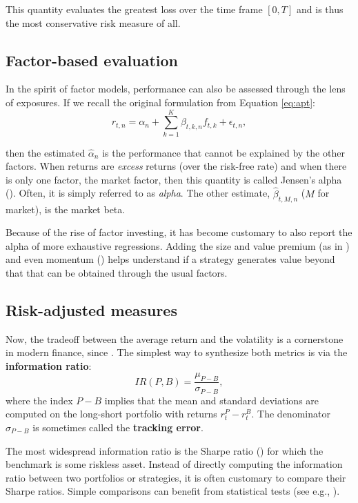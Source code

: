 \documentclass[]{krantz}
\theoremstyle{definition}
\theoremstyle{definition}
\theoremstyle{definition}
\theoremstyle{remark}
\begin{document}
This quantity evaluates the greatest loss over the time frame \([0,T]\)
and is thus the most conservative risk measure of all.

\hypertarget{factor-based-evaluation}{%
\subsection{Factor-based evaluation}\label{factor-based-evaluation}}

In the spirit of factor models, performance can also be assessed through
the lens of exposures. If we recall the original formulation from
Equation \eqref{eq:apt}:
\[r_{t,n}= \alpha_n+\sum_{k=1}^K\beta_{t,k,n}f_{t,k}+\epsilon_{t,n}, \]

then the estimated \(\hat{\alpha}_n\) is the performance that cannot be
explained by the other factors. When returns are \emph{excess} returns
(over the risk-free rate) and when there is only one factor, the market
factor, then this quantity is called Jensen's alpha
(\citet{jensen1968performance}). Often, it is simply referred to as
\emph{alpha}. The other estimate, \(\hat{\beta}_{t,M,n}\) (\(M\) for
market), is the market beta.

Because of the rise of factor investing, it has become customary to also
report the alpha of more exhaustive regressions. Adding the size and
value premium (as in \citet{fama1993common}) and even momentum
(\citet{carhart1997persistence}) helps understand if a strategy
generates value beyond that that can be obtained through the usual
factors.

\hypertarget{risk-adjusted-measures}{%
\subsection{Risk-adjusted measures}\label{risk-adjusted-measures}}

Now, the tradeoff between the average return and the volatility is a
cornerstone in modern finance, since \citet{markowitz1952portfolio}. The
simplest way to synthesize both metrics is via the \textbf{information
ratio}: \[IR(P,B)=\frac{\mu_{P-B}}{\sigma_{P-B}},\] where the index
\(P-B\) implies that the mean and standard deviations are computed on
the long-short portfolio with returns \(r_t^P-r_t^B\). The denominator
\(\sigma_{P-B}\) is sometimes called the \textbf{tracking error}.

The most widespread information ratio is the Sharpe ratio
(\citet{sharpe1966mutual}) for which the benchmark is some riskless
asset. Instead of directly computing the information ratio between two
portfolios or strategies, it is often customary to compare their Sharpe
ratios. Simple comparisons can benefit from statistical tests (see e.g.,
\citet{ledoit2008robust}).
\end{document}
